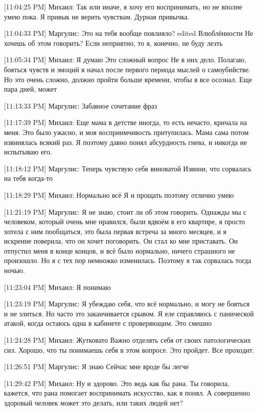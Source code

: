 \documentclass{article}
\begin{document}
[11:04:25 PM] Михаил:
Так или иначе, я хочу его воспринимать, но не вполне умею пока. Я привык не верить чувствам. Дурная привычка.

[11:04:33 PM] Маргулис:
Это на тебя вообще повлияло?
edited 
Влюблённости
 Не хочешь об этом говорить?
 Если неприятно, то я, конечно, не буду лезть

[11:05:34 PM] Михаил:
Я думаю
 Это сложный вопрос
 Не в них дело. Полагаю, бояться чувств и эмоций я начал после первого периода мыслей о самоубийстве. Но это очень сложно, должно пройти больше времени, чтобы я все осознал.
 Еще пара дней, может

[11:13:33 PM] Маргулис:
Забавное сочетание фраз

[11:17:39 PM] Михаил:
Еще мама в детстве иногда, то есть нечасто, кричала на меня. Это было ужасно, и моя восприимчивость притупилась. Мама сама потом извинялась всякий раз. Я поэтому давно понял абсурдность гнева, и никогда не испытываю его.

[11:18:12 PM] Маргулис:
Теперь чувствую себя виноватой
 Извини, что сорвалась на тебя когда-то

[11:18:29 PM] Михаил:
Нормально всё
 Я и прощать поэтому отлично умею

[11:21:19 PM] Маргулис:
Я не знаю, стоит ли об этом говорить. Однажды мы с человеком, который очень мне нравился, были вдвоём в его квартире, я просто хотела с ним пообщаться, это была первая встреча за много месяцев, и я искренне поверила, что он хочет поговорить. Он стал ко мне приставать. Он отпустил меня в конце концов, и всё было нормально, ничего страшного не произошло. Но я с тех пор немножко изменилась.
 Поэтому я так сорвалась тогда ночью.

[11:23:04 PM] Михаил:
Я понимаю

[11:23:19 PM] Маргулис:
Я убеждаю себя, что всё нормально, и могу не бояться и не злиться. Но часто это заканчивается срывом.
 Я еле справляюсь с панической атакой, когда остаюсь одна в кабинете с проверяющим.
 Это смешно

[11:24:28 PM] Михаил:
Жутковато
 Важно отделять себя от своих патологических сил. Хорошо, что ты понимаешь себя в этом вопросе.
 Это пройдет. Все проходит.

[11:26:51 PM] Маргулис:
Я знаю
 Сейчас мне вроде бы легче

[11:29:42 PM] Михаил:
Ну и здорово. Это ведь как бы рана. Ты говорила, кажется, что рана помогает воспринимать искусство, как я понял. А совершенно здоровый человек может это делать, или таких людей нет?
\end{document}
